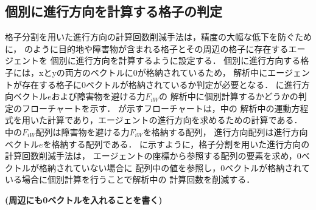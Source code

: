 \subsection{個別に進行方向を計算する格子の判定}
格子分割を用いた進行方向の計算回数削減手法は，精度の大幅な低下を防ぐために，
のように目的地や障害物が含まれる格子とその周辺の格子に存在するエージェントを
個別に進行方向を計算するように設定する．
個別に進行方向する格子には，xとyの両方のベクトルに0が格納されているため，
解析中にエージェントが存在する格子に0ベクトルが格納されているか判定が必要となる．
に進行方向ベクトル$e$および障害物を避ける力$F_{iW}$の
解析中に個別計算するかどうかの判定のフローチャートを示す．
が示すフローチャートは，中の
解析中の運動方程式を用いた計算であり，エージェントの進行方向を求めるための計算である．
中の$F_{iW}$配列は障害物を避ける力$F_{iW}$を格納する配列，
進行方向配列は進行方向ベクトル$e$を格納する配列である．
に示すように，格子分割を用いた進行方向の計算回数削減手法は，
エージェントの座標から参照する配列の要素を求め，0ベクトルが格納されていない場合に
配列中の値を参照し，0ベクトルが格納されている場合に個別計算を行うことで解析中の
計算回数を削減する．

\textbf{(周辺にも0ベクトルを入れることを書く)}




\clearpage
